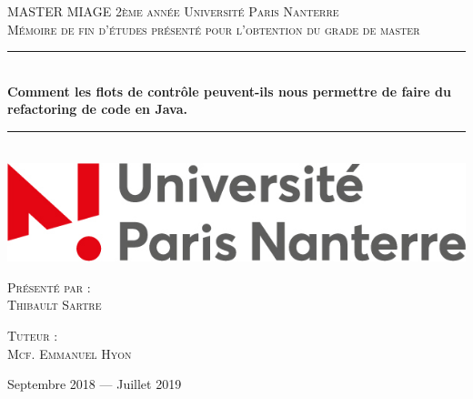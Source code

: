 \documentclass[a4paper,twoside,12pt,openright]{report}
\newcommand{\HRule}{\rule{\linewidth}{0.5mm}}
\begin{document}
\begin{titlepage}
  \begin{sffamily}
  \begin{center}

    \textsc{\LARGE MASTER MIAGE 2ème année \linebreak Université Paris Nanterre}\\[2cm]

    \textsc{\Large Mémoire de fin d’études présenté pour l’obtention du grade de master}\\[1.5cm]

    \HRule \\[0.4cm]
    { \huge \bfseries Comment les flots de contrôle peuvent-ils nous permettre de faire du refactoring de code en Java. \\[0.4cm] }

    \HRule \\[2cm]
    \includegraphics[scale=0.40]{image/univ.jpg}
    \hspace{2cm}
    
    \vfill
  \begin{minipage}{0.4\textwidth}
      \begin{flushleft} \large
        \textsc{Présenté par :}\\ \textsc{Thibault Sartre}\\
      \end{flushleft}
    \end{minipage}
    \begin{minipage}{0.4\textwidth}
      \begin{flushright} \large
        \textsc{Tuteur :}\\ \textsc{Mcf. Emmanuel Hyon}\\
      \end{flushright}
    \end{minipage}
    \vfill
    {\large Septembre 2018 — Juillet 2019}
  \end{center}
  \end{sffamily}
\end{titlepage}
\renewcommand{\contentsname}{Sommaire}
\tableofcontents{}
\end{document}
